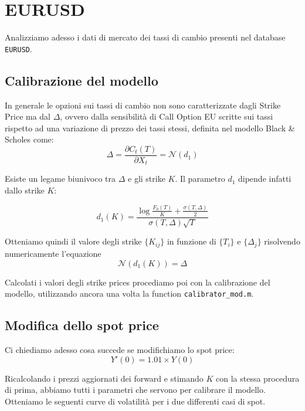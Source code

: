 \documentclass[11pt]{article}
\begin{document}
\section{EURUSD}
Analizziamo adesso i dati di mercato dei tassi di cambio presenti nel database \texttt{EURUSD}. 

\subsection{Calibrazione del modello}
In generale le opzioni sui tassi di cambio non sono caratterizzate dagli Strike Price
ma dal $\Delta$, ovvero dalla sensibilità di Call Option EU scritte sui tassi rispetto ad una variazione di prezzo dei tassi stessi, definita nel modello Black \& Scholes come:
\begin{equation}
\Delta = \frac{\partial C_t(T)}{\partial X_t} = \mathcal{N}(d_1)
\end{equation}

Esiste un legame biunivoco tra $\Delta$ e gli strike $K$. Il parametro $d_1$ dipende infatti dallo strike $K$:

\begin{equation}
d_1(K) = \frac{\log\frac{F_0(T)}{K}+ \frac{\sigma(T,\Delta)}{2}}{\sigma(T,\Delta)\sqrt{T}}
\end{equation}

Otteniamo quindi il valore degli strike $\{ K_{ij}\}$ in funzione di $\{ T_i\}$ e $\{ \Delta_j\}$ risolvendo numericamente l'equazione $$\mathcal{N}(d_1(K)) = \Delta$$

Calcolati i valori degli strike prices procediamo poi con la calibrazione del modello, utilizzando ancora una volta la function \texttt{calibrator\_mod.m}.

\subsection{Modifica dello spot price}

Ci chiediamo adesso cosa succede se modifichiamo lo spot price:
$$ Y'(0) = 1.01\times Y(0)$$

Ricalcolando i prezzi aggiornati dei forward e stimando $K$ con la stessa procedura di prima, abbiamo tutti i parametri che servono per calibrare il modello. Otteniamo le seguenti curve di volatilità per i due differenti casi di spot.\\
\end{document}
